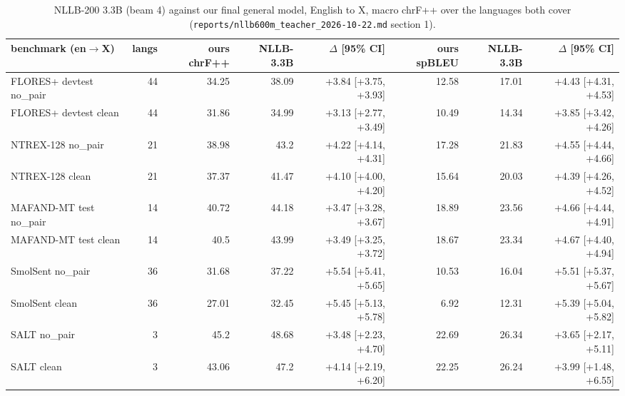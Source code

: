 \begin{table}[t]
\centering
\footnotesize
\setlength{\tabcolsep}{3pt}
\caption{NLLB-200 3.3B (beam 4) against our final general model, English to X, macro chrF++ over the languages both cover (\texttt{reports/nllb600m\_teacher\_2026-10-22.md} section 1).}
\label{tab:t_nllb}
\begin{adjustbox}{max width=\linewidth}
{\def\LTcaptype{none} %
\begin{tabular}{@{}lrrrrrrr@{}}
\toprule
benchmark (en\(\to\)X) & langs & ours chrF++ & NLLB-3.3B & \(\Delta\) {[}95\% CI{]} & ours spBLEU & NLLB-3.3B & \(\Delta\) {[}95\% CI{]} \\
\midrule
FLORES+ devtest no\_pair & 44 & 34.25 & 38.09 & +3.84 {[}+3.75, +3.93{]} & 12.58 & 17.01 & +4.43 {[}+4.31, +4.53{]} \\
FLORES+ devtest clean & 44 & 31.86 & 34.99 & +3.13 {[}+2.77, +3.49{]} & 10.49 & 14.34 & +3.85 {[}+3.42, +4.26{]} \\
NTREX-128 no\_pair & 21 & 38.98 & 43.2 & +4.22 {[}+4.14, +4.31{]} & 17.28 & 21.83 & +4.55 {[}+4.44, +4.66{]} \\
NTREX-128 clean & 21 & 37.37 & 41.47 & +4.10 {[}+4.00, +4.20{]} & 15.64 & 20.03 & +4.39 {[}+4.26, +4.52{]} \\
MAFAND-MT test no\_pair & 14 & 40.72 & 44.18 & +3.47 {[}+3.28, +3.67{]} & 18.89 & 23.56 & +4.66 {[}+4.44, +4.91{]} \\
MAFAND-MT test clean & 14 & 40.5 & 43.99 & +3.49 {[}+3.25, +3.72{]} & 18.67 & 23.34 & +4.67 {[}+4.40, +4.94{]} \\
SmolSent no\_pair & 36 & 31.68 & 37.22 & +5.54 {[}+5.41, +5.65{]} & 10.53 & 16.04 & +5.51 {[}+5.37, +5.67{]} \\
SmolSent clean & 36 & 27.01 & 32.45 & +5.45 {[}+5.13, +5.78{]} & 6.92 & 12.31 & +5.39 {[}+5.04, +5.82{]} \\
SALT no\_pair & 3 & 45.2 & 48.68 & +3.48 {[}+2.23, +4.70{]} & 22.69 & 26.34 & +3.65 {[}+2.17, +5.11{]} \\
SALT clean & 3 & 43.06 & 47.2 & +4.14 {[}+2.19, +6.20{]} & 22.25 & 26.24 & +3.99 {[}+1.48, +6.55{]} \\
\bottomrule
\end{tabular}
}
\end{adjustbox}
\end{table}


